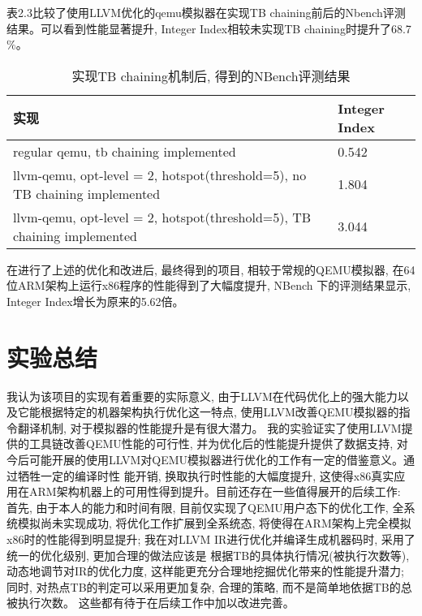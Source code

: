     表2.3比较了使用LLVM优化的qemu模拟器在实现TB chaining前后的Nbench评测结果。可以看到性能显著提升, Integer Index相较未实现TB chaining时提升了68.7$\%$。


    \begin{table}[htbp]
    \begin{minipage}{0.8\textwidth}
    \centering
    \caption{实现TB chaining机制后, 得到的NBench评测结果}
    \label{tab:parallel1}
    \begin{tabular}{p{4cm}p{4cm}}
    \toprule[1.5pt]
    实现 & Integer Index \\\midrule[1pt]
    regular qemu, tb chaining implemented & 0.542 \\\midrule[1pt]
    llvm-qemu, opt-level = 2, hotspot(threshold=5), no TB chaining implemented & 1.804 \\\midrule[1pt]
    llvm-qemu, opt-level = 2, hotspot(threshold=5), TB chaining implemented & 3.044 \\\bottomrule[1.5pt]
    \end{tabular}
    \end{minipage}%
    \end{table}

    在进行了上述的优化和改进后, 最终得到的项目, 相较于常规的QEMU模拟器, 在64位ARM架构上运行x86程序的性能得到了大幅度提升, NBench
    下的评测结果显示, Integer Index增长为原来的5.62倍。

\section{实验总结}
    我认为该项目的实现有着重要的实际意义, 由于LLVM在代码优化上的强大能力以及它能根据特定的机器架构执行优化这一特点, 使用LLVM改善QEMU模拟器的指令翻译机制, 对于模拟器的性能提升是有很大潜力。
    我的实验证实了使用LLVM提供的工具链改善QEMU性能的可行性, 并为优化后的性能提升提供了数据支持, 对今后可能开展的使用LLVM对QEMU模拟器进行优化的工作有一定的借鉴意义。通过牺牲一定的编译时性
    能开销, 换取执行时性能的大幅度提升, 这使得x86真实应用在ARM架构机器上的可用性得到提升。目前还存在一些值得展开的后续工作: 首先, 由于本人的能力和时间有限, 目前仅实现了QEMU用户态下的优化工作,
    全系统模拟尚未实现成功, 将优化工作扩展到全系统态, 将使得在ARM架构上完全模拟x86时的性能得到明显提升; 我在对LLVM IR进行优化并编译生成机器码时, 采用了统一的优化级别, 更加合理的做法应该是
    根据TB的具体执行情况(被执行次数等), 动态地调节对IR的优化力度, 这样能更充分合理地挖掘优化带来的性能提升潜力; 同时, 对热点TB的判定可以采用更加复杂, 合理的策略, 而不是简单地依据TB的总被执行次数。
    这些都有待于在后续工作中加以改进完善。


